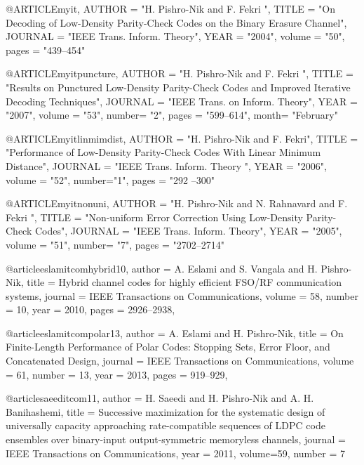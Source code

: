 {{{{@ARTICLE{myit,
	AUTHOR =       "H. Pishro-Nik and F. Fekri  ",
	TITLE =        "On Decoding of Low-Density Parity-Check Codes on the Binary Erasure Channel",
	JOURNAL =      "IEEE Trans. Inform. Theory",
	YEAR =         "2004",
	volume =       "50",
	pages =        "439--454"
}




@ARTICLE{myitpuncture,
	AUTHOR =       "H. Pishro-Nik and F. Fekri  ",
	TITLE =        "Results on Punctured Low-Density Parity-Check Codes and Improved Iterative Decoding Techniques",
	JOURNAL =      "IEEE Trans. on Inform. Theory",
	YEAR =         "2007",
	volume =       "53",
	number=        "2",
	pages =        "599--614",
	month= "February"
}




@ARTICLE{myitlinmimdist,
	AUTHOR =       "H. Pishro-Nik and F. Fekri",
	TITLE =        "Performance of Low-Density Parity-Check Codes With Linear Minimum Distance",
	JOURNAL =         "IEEE Trans. Inform. Theory ",
	YEAR =         "2006",
	volume =       "52",
	number="1",
	pages =        "292 --300"
}






@ARTICLE{myitnonuni,
	AUTHOR =       "H. Pishro-Nik and N. Rahnavard and F. Fekri  ",
	TITLE =        "Non-uniform Error Correction Using Low-Density Parity-Check Codes",
	JOURNAL =      "IEEE Trans. Inform. Theory",
	YEAR =         "2005",
	volume =       "51",
	number=  "7",
	pages =        "2702--2714"
}





@article{eslamitcomhybrid10,
	author = {A. Eslami and S. Vangala and H. Pishro-Nik},
	title = {Hybrid channel codes for highly efficient FSO/RF communication systems},
	journal = {IEEE Transactions on Communications},
	volume = {58},
	number = {10},
	year = {2010},
	pages = {2926--2938},
}


@article{eslamitcompolar13,
	author = {A. Eslami and H. Pishro-Nik},
	title = {On Finite-Length Performance of Polar Codes: Stopping Sets, Error Floor, and Concatenated Design},
	journal = {IEEE Transactions on Communications},
	volume = {61},
	number = {13},
	year = {2013},
	pages = {919--929},
}



@article{saeeditcom11,
	author = {H. Saeedi and H. Pishro-Nik and  A. H. Banihashemi},
	title = {Successive maximization for the systematic design of universally capacity approaching rate-compatible
	sequences of LDPC code ensembles over binary-input output-symmetric memoryless channels},
	journal = {IEEE Transactions on Communications},
	year = {2011},
	volume={59},
	number = {7}
}


}}}}
